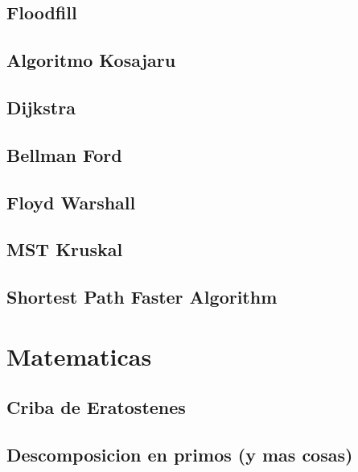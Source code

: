\subsection{Floodfill}
\raggedbottom
\hrulefill
\subsection{Algoritmo Kosajaru}
\raggedbottom
\hrulefill
\subsection{Dijkstra}
\raggedbottom
\hrulefill
\subsection{Bellman Ford}
\raggedbottom
\hrulefill
\subsection{Floyd Warshall}
\raggedbottom
\hrulefill
\subsection{MST Kruskal}
\raggedbottom
\hrulefill
\subsection{Shortest Path Faster Algorithm}
\raggedbottom
\hrulefill

\section{Matematicas}
\subsection{Criba de Eratostenes}
\raggedbottom
\hrulefill
\subsection{Descomposicion en primos (y mas cosas)}
\raggedbottom
\hrulefill
